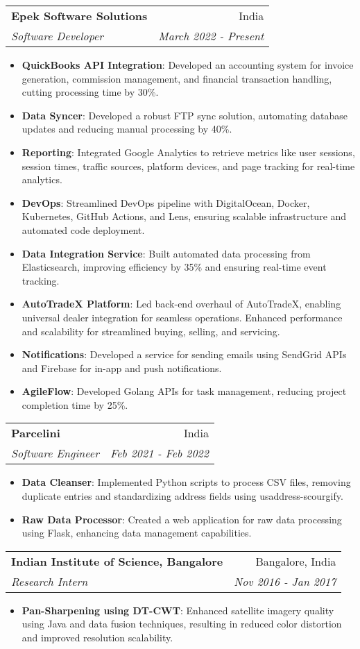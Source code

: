 \documentclass[letterpaper,11pt]{article}
\makeatletter
\newcommand{\resumeItem}[2]{
  \item\small{
    \textbf{#1}{: #2 \vspace{-2pt}}
  }
}
\newcommand{\resumeSubheading}[4]{
  \vspace{-1pt}\item
    \begin{tabular*}{0.97\textwidth}{l@{\extracolsep{\fill}}r}
      \textbf{#1} & #2 \\
      \textit{\small#3} & \textit{\small #4} \\
    \end{tabular*}\vspace{-5pt}
}
\newcommand{\resumeItemListStart}{\begin{itemize}}
\newcommand{\resumeItemListEnd}{\end{itemize}\vspace{-5pt}}
\makeatother
\begin{document}
    \resumeSubheading
      {Epek Software Solutions}{India}
      {Software Developer}{March 2022 - Present}
      \resumeItemListStart
        \resumeItem{QuickBooks API Integration}
        {Developed an accounting system for invoice generation, commission management, and financial transaction handling, cutting processing time by 30\%.}
        \resumeItem{Data Syncer}
        {Developed a robust FTP sync solution, automating database updates and reducing manual processing by 40\%.}
        \resumeItem{Reporting}
        {Integrated Google Analytics to retrieve metrics like user sessions, session times, traffic sources, platform devices, and page tracking for real-time analytics.}
        \resumeItem{DevOps}
        {Streamlined DevOps pipeline with DigitalOcean, Docker, Kubernetes, GitHub Actions, and Lens, ensuring scalable infrastructure and automated code deployment.}
        \resumeItem{Data Integration Service}
        {Built automated data processing from Elasticsearch, improving efficiency by 35\% and ensuring real-time event tracking.}
        \resumeItem{AutoTradeX Platform}
        {Led back-end overhaul of AutoTradeX, enabling universal dealer integration for seamless operations. Enhanced performance and scalability for streamlined buying, selling, and servicing.}
        \resumeItem{Notifications}
        {Developed a service for sending emails using SendGrid APIs and Firebase for in-app and push notifications.}
        \resumeItem{AgileFlow}
        {Developed Golang APIs for task management, reducing project completion time by 25\%.}
      \resumeItemListEnd

    \resumeSubheading
      {Parcelini}{India}
      {Software Engineer}{Feb 2021 - Feb 2022}
      \resumeItemListStart
        \resumeItem{Data Cleanser}
        {Implemented Python scripts to process CSV files, removing duplicate entries and standardizing address fields using usaddress-scourgify.}
        \resumeItem{Raw Data Processor}
        {Created a web application for raw data processing using Flask, enhancing data management capabilities.}
      \resumeItemListEnd

    \resumeSubheading
      {Indian Institute of Science, Bangalore}{Bangalore, India}
      {Research Intern}{Nov 2016 - Jan 2017}
      \resumeItemListStart
        \resumeItem{Pan-Sharpening using DT-CWT}
        {Enhanced satellite imagery quality using Java and data fusion techniques, resulting in reduced color distortion and improved resolution scalability.}
      \resumeItemListEnd
\end{document}
